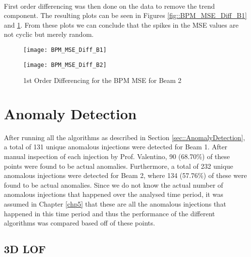 \paragraph{ }First order differencing was then done on the data to remove the trend component. The resulting plots can be seen in Figures \ref{fig::BPM_MSE_Diff_B1} and \ref{fig::BPM_MSE_Diff_B2}. From these plots we can conclude that the spikes in the \acs{MSE} values are not cyclic but merely random.

\begin{figure}[!t]
	\begin{minipage}[b]{0.475\linewidth}
		\centering
		\texttt{[image: BPM\_MSE\_Diff\_B1]}
		\caption[BPM MSE Differencing B1]{1st Order Differencing for the BPM MSE for Beam 1}
		\label{fig::BPM_MSE_Diff_B1}
	\end{minipage}	
	\hspace{0.25cm}
	\begin{minipage}[b]{0.475\linewidth}
		\centering
		\texttt{[image: BPM\_MSE\_Diff\_B2]}
		\caption[BPM MSE Differencing B2]{1st Order Differencing for the BPM MSE for Beam 2}
		\label{fig::BPM_MSE_Diff_B2}
	\end{minipage}	
\end{figure}

\section{Anomaly Detection}

\paragraph{ }After running all the algorithms as described in Section \ref{sec::AnomalyDetection}, a total of 131 unique anomalous injections were detected for Beam 1. After manual inspection of each injection by Prof. Valentino, 90 (68.70\%) of these points were found to be actual anomalies. Furthermore, a total of 232 unique anomalous injections were detected for Beam 2, where 134 (57.76\%) of these were found to be actual anomalies. Since we do not know the actual number of anomalous injections that happened over the analysed time period, it was assumed in Chapter \ref{chp5} that these are all the anomalous injections that happened in this time period and  thus the performance of the different algorithms was compared based off of these points.

\subsection{3D \acs{LOF}}

